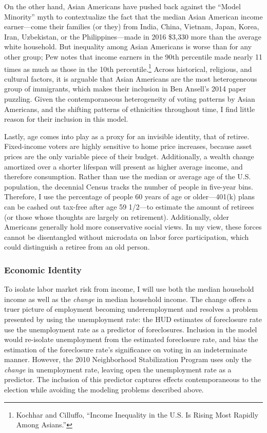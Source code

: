 \documentclass[
]{article}
\begin{document}
On the other hand, Asian Americans have pushed back against the ``Model Minority'' myth to contextualize the fact that the median Asian American income earner---come their families (or they) from India, China, Vietnam, Japan, Korea, Iran, Uzbekistan, or the Philippines---made in 2016 \$3,330 more than the average white household.
But inequality among Asian Americans is worse than for any other group; Pew notes that income earners in the 90th percentile made nearly 11 times as much as those in the 10th percentile.\footnote{Kochhar and Cilluffo, ``Income Inequality in the U.S. Is Rising Most Rapidly Among Asians.''}
Across historical, religious, and cultural factors, it is arguable that Asian Americans are the most heterogeneous group of immigrants, which makes their inclusion in Ben Ansell's 2014 paper puzzling.
Given the contemporaneous heterogeneity of voting patterns by Asian Americans, and the shifting patterns of ethnicities throughout time, I find little reason for their inclusion in this model.

Lastly, age comes into play as a proxy for an invisible identity, that of retiree.
Fixed-income voters are highly sensitive to home price increases, because asset prices are the only variable piece of their budget.
Additionally, a wealth change amortized over a shorter lifespan will present as higher average income, and therefore consumption.
Rather than use the median or average age of the U.S. population, the decennial Census tracks the number of people in five-year bins.
Therefore, I use the percentage of people 60 years of age or older---401(k) plans can be cashed out tax-free after age 59 1/2---to estimate the amount of retirees (or those whose thoughts are largely on retirement).
Additionally, older Americans generally hold more conservative social views.
In my view, these forces cannot be disentangled without microdata on labor force participation, which could distinguish a retiree from an old person.

\hypertarget{economic-identity}{%
\subsubsection{Economic Identity}\label{economic-identity}}

To isolate labor market risk from income, I will use both the median household income as well as the \emph{change} in median household income.
The change offers a truer picture of employment becoming underemployment and resolves a problem presented by using the unemployment rate: the HUD estimates of foreclosure rate use the unemployment rate as a predictor of foreclosures.
Inclusion in the model would re-isolate unemployment from the estimated foreclosure rate, and bias the estimation of the foreclosure rate's significance on voting in an indeterminate manner.
However, the 2010 Neighborhood Stabilization Program uses only the \emph{change} in unemployment rate, leaving open the unemployment rate as a predictor.
The inclusion of this predictor captures effects contemporaneous to the election while avoiding the modeling problems described above.
\end{document}
